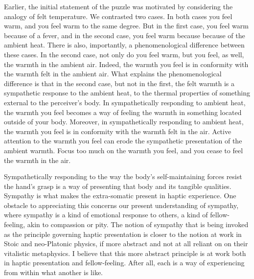 Earlier, the initial statement of the puzzle was motivated by considering the analogy of felt temperature. We contrasted two cases. In both cases you feel warm, and you feel warm to the same degree. But in the first case, you feel warm because of a fever, and in the second case, you feel warm because because of the ambient heat. There is also, importantly, a phenomenological difference between these cases. In the second case, not only do you feel warm, but you feel, as well, the warmth in the ambient air. Indeed, the warmth you feel is in conformity with the warmth felt in the ambient air. What explains the phenomenological difference is that in the second case, but not in the first, the felt warmth is a sympathetic response to the ambient heat, to the thermal properties of something external to the perceiver's body. In sympathetically responding to ambient heat, the warmth you feel becomes a way of feeling the warmth in something located outside of your body. Moreover, in sympathetically responding to ambient heat, the warmth you feel is in conformity with the warmth felt in the air. Active attention to the warmth you feel can erode the sympathetic presentation of the ambient warmth. Focus too much on the warmth you feel, and you cease to feel the warmth in the air.

Sympathetically responding to the way the body's self-maintaining forces resist the hand's grasp is a way of presenting that body and its tangible qualities. Sympathy is what makes the extra-somatic present in haptic experience. One obstacle to appreciating this concerns our present understanding of sympathy, where sympathy is a kind of emotional response to others, a kind of fellow-feeling, akin to compassion or pity. The notion of sympathy that is being invoked as the principle governing haptic presentation is closer to the notion at work in Stoic and neo-Platonic physics, if more abstract and not at all reliant on on their vitalistic metaphysics. I believe that this more abstract principle is at work both in haptic presentation and fellow-feeling. After all, each is a way of experiencing from within what another is like.

